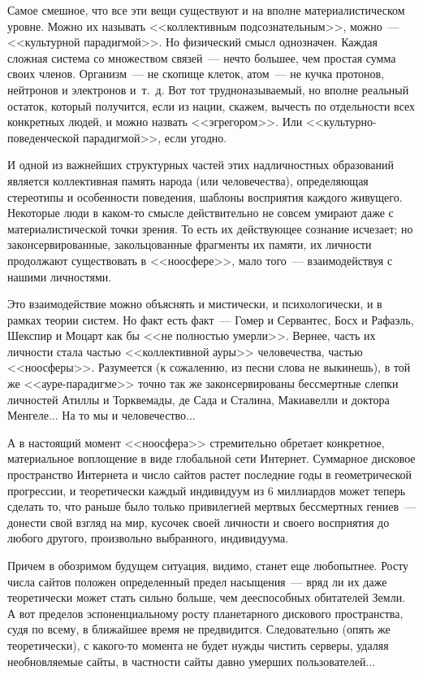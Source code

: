 \documentclass{scrbook}
\newcommand{\flqq}{<<}
\newcommand{\frqq}{>>}
\newcommand{\mdash}{~--- }
\begin{document}
Самое смешное, что все эти вещи существуют и на вполне материалистическом уровне. Можно их называть {\flqq}коллективным подсознательным{\frqq}, можно{\mdash}{\flqq}культурной парадигмой{\frqq}. Но физический смысл однозначен. Каждая сложная система со множеством связей{\mdash}нечто большее, чем простая сумма своих членов. Организм{\mdash}не скопище клеток, атом{\mdash}не кучка протонов, нейтронов и электронов и~т.~д. Вот тот трудноназываемый, но вполне реальный остаток, который получится, если из нации, скажем, вычесть по отдельности всех конкретных людей, и можно назвать {\flqq}эгрегором{\frqq}. Или {\flqq}культурно-поведенческой парадигмой{\frqq}, если угодно.

И одной из важнейших структурных частей этих надличностных образований является коллективная память народа (или человечества), определяющая стереотипы и особенности поведения, шаблоны восприятия каждого живущего. Некоторые люди в каком-то смысле действительно не совсем умирают даже с материалистической точки зрения. То есть их действующее сознание исчезает; но законсервированные, закольцованные фрагменты их памяти, их личности продолжают существовать в {\flqq}ноосфере{\frqq}, мало того{\mdash}взаимодействуя с нашими личностями.

Это взаимодействие можно объяснять и мистически, и психологически, и в рамках теории систем. Но факт есть факт{\mdash}Гомер и Сервантес, Босх и Рафаэль, Шекспир и Моцарт как бы {\flqq}не полностью умерли{\frqq}. Вернее, часть их личности стала частью {\flqq}коллективной ауры{\frqq} человечества, частью {\flqq}ноосферы{\frqq}. Разумеется (к сожалению, из песни слова не выкинешь), в той же {\flqq}ауре-парадигме{\frqq} точно так же законсервированы бессмертные слепки личностей Атиллы и Торквемады, де Сада и Сталина, Макиавелли и доктора Менгеле... На то мы и человечество...

А в настоящий момент {\flqq}ноосфера{\frqq} стремительно обретает конкретное, материальное воплощение в виде глобальной сети Интернет. Суммарное дисковое пространство Интернета и число сайтов растет последние годы в геометрической прогрессии, и теоретически каждый индивидуум из 6 миллиардов может теперь сделать то, что раньше было только привилегией мертвых бессмертных гениев{\mdash}донести свой взгляд на мир, кусочек своей личности и своего восприятия до любого другого, произвольно выбранного, индивидуума.

Причем в обозримом будущем ситуация, видимо, станет еще любопытнее. Росту числа сайтов положен определенный предел насыщения{\mdash}вряд ли их даже теоретически может стать сильно больше, чем дееспособных обитателей Земли. А вот пределов эспоненциальному росту планетарного дискового пространства, судя по всему, в ближайшее время не предвидится. Следовательно (опять же теоретически), с какого-то момента не будет нужды чистить серверы, удаляя необновляемые сайты, в частности сайты давно умерших пользователей...
\end{document}
